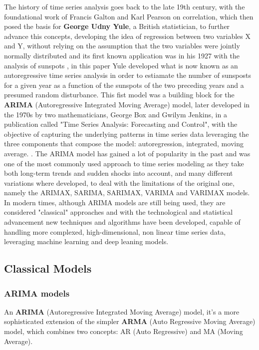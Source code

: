 The history of time series analysis goes back to the late 19th century, with the foundational work of Francis Galton and Karl Pearson on correlation, which then posed the basis for \textbf{George Udny Yule}, a British statistician, to further advance this concepts, developing the idea of regression between two variables X and Y, without relying on the assumption that the two variables were jointly normally distributed \cite{l_kristensen_foundations_2021} and its first known application was in his 1927 with the analysis of sunspots \cite{SILVERMAN198899}, in this paper Yule developed what is now known as an autoregressive time series analysis in order to estiamate the number of sunsposts for a given year as a function of the sunspots of the two preceding years and a presumed random disturbance. This fist model was a building block for the \textbf{ARIMA} (Autoregressive Integrated Moving Average) model, later developed in the 1970s by two mathematicians, George Box and Gwilym Jenkins, in a publication called "Time Series Analysis: Forecasting and Control", with the objective of capturing the underlying patterns in time series data leveraging the three components that compose the model: autoregression, integrated, moving average. \cite{article_2}. The ARIMA model has gained a lot of popularity in the past and was one of the most commonly used approach to time series modeling as they take both long-term trends and sudden shocks into account, and many different variations where developed, to deal with the limitations of the original one, namely the ARIMAX, SARIMA, SARIMAX, VARIMA and VARIMAX models. In modern times, although ARIMA models are still being used, they are considered "classical" approaches and with the technological and statistical advancement new techniques and algorithms have been developed, capable of handling more complexed, high-dimensional, non linear time series data, leveraging machine learning and deep leaning models.


\subsection{Classical Models}  %
\subsubsection{ARIMA models}
An \textbf{ARIMA} (Autoregressive Integrated Moving Average) model, it's a more sophisticated extension of the simpler \textbf{ARMA} (Auto Regressive Moving Average) model, which combines two concepts: AR (Auto Regressive) and MA (Moving Average). 

